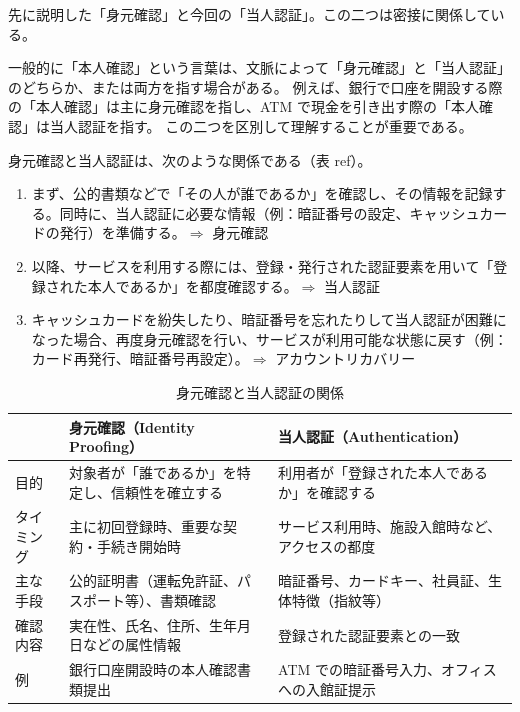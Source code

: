 \documentclass[uplatex]{jsarticle}
\def\ref#1{ref}%
\def\label#1{}%
\begin{document}
先に説明した「身元確認」と今回の「当人認証」。この二つは密接に関係している。

\begin{rem}\label{rem:honnin-kakunin}
一般的に「本人確認」という言葉は、文脈によって「身元確認」と「当人認証」のどちらか、または両方を指す場合がある。
例えば、銀行で口座を開設する際の「本人確認」は主に身元確認を指し、ATM で現金を引き出す際の「本人確認」は当人認証を指す。
この二つを区別して理解することが重要である。
\end{rem}

身元確認と当人認証は、次のような関係である（表 \ref{tab:ch2-proofing-vs-authn}）。
\begin{enumerate}
\item まず、公的書類などで「その人が誰であるか」を確認し、その情報を記録する。同時に、当人認証に必要な情報（例：暗証番号の設定、キャッシュカードの発行）を準備する。$\Rightarrow$ 身元確認
\item 以降、サービスを利用する際には、登録・発行された認証要素を用いて「登録された本人であるか」を都度確認する。$\Rightarrow$ 当人認証
\item キャッシュカードを紛失したり、暗証番号を忘れたりして当人認証が困難になった場合、再度身元確認を行い、サービスが利用可能な状態に戻す（例：カード再発行、暗証番号再設定）。$\Rightarrow$ アカウントリカバリー
\end{enumerate}

\begin{table}[H]
\centering
\caption{身元確認と当人認証の関係}\label{tab:ch2-proofing-vs-authn}
\begin{tabular}{|p{}|p{}|p{}|}
\hline
 & 身元確認（Identity Proofing） & 当人認証（Authentication） \\ \hline
目的 & 対象者が「誰であるか」を特定し、信頼性を確立する & 利用者が「登録された本人であるか」を確認する \\ \hline
タイミング & 主に初回登録時、重要な契約・手続き開始時 & サービス利用時、施設入館時など、アクセスの都度 \\ \hline
主な手段 & 公的証明書（運転免許証、パスポート等）、書類確認 & 暗証番号、カードキー、社員証、生体特徴（指紋等） \\ \hline
確認内容 & 実在性、氏名、住所、生年月日などの属性情報 & 登録された認証要素との一致 \\ \hline
例 & 銀行口座開設時の本人確認書類提出 & ATM での暗証番号入力、オフィスへの入館証提示 \\ \hline
\end{tabular}
\end{table}
\end{document}
